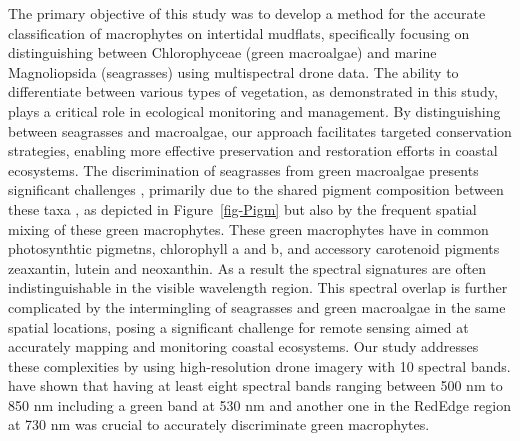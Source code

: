 \documentclass[
  number]{elsarticle}
\begin{document}
The primary objective of this study was to develop a method for the
accurate classification of macrophytes on intertidal mudflats,
specifically focusing on distinguishing between Chlorophyceae (green
macroalgae) and marine Magnoliopsida (seagrasses) using multispectral
drone data. The ability to differentiate between various types of
vegetation, as demonstrated in this study, plays a critical role in
ecological monitoring and management. By distinguishing between
seagrasses and macroalgae, our approach facilitates targeted
conservation strategies, enabling more effective preservation and
restoration efforts in coastal ecosystems. The discrimination of
seagrasses from green macroalgae presents significant challenges
\citetext{\citealp[ ]{oiry2021using}; \citealp{bannari2022}}, primarily
due to the shared pigment composition between these taxa
\citep{mckenzie2020global}, as depicted in Figure~\ref{fig-Pigm} but
also by the frequent spatial mixing of these green macrophytes. These
green macrophytes have in common photosynthtic pigmetns, chlorophyll a
and b, and accessory carotenoid pigments zeaxantin, lutein and
neoxanthin. As a result the spectral signatures are often
indistinguishable in the visible wavelength region. This spectral
overlap is further complicated by the intermingling of seagrasses and
green macroalgae in the same spatial locations, posing a significant
challenge for remote sensing aimed at accurately mapping and monitoring
coastal ecosystems. Our study addresses these complexities by using
high-resolution drone imagery with 10 spectral bands. \citep{Davies2023}
have shown that having at least eight spectral bands ranging between 500
nm to 850 nm including a green band at 530 nm and another one in the
RedEdge region at 730 nm was crucial to accurately discriminate green
macrophytes.
\end{document}

